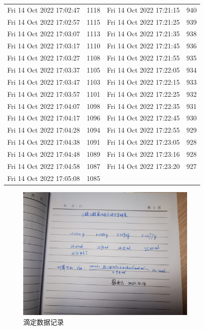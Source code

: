 \documentclass[12pt]{ctexart}
\numberwithin{equation}{section}
\begin{document}
\begin{longtable}{cc|cc}
Fri 14 Oct 2022 17:02:47 & 1118 & Fri 14 Oct 2022 17:21:15 & 940 \\
Fri 14 Oct 2022 17:02:57 & 1115 & Fri 14 Oct 2022 17:21:25 & 939 \\
Fri 14 Oct 2022 17:03:07 & 1113 & Fri 14 Oct 2022 17:21:35 & 938 \\
Fri 14 Oct 2022 17:03:17 & 1110 & Fri 14 Oct 2022 17:21:45 & 936 \\
Fri 14 Oct 2022 17:03:27 & 1108 & Fri 14 Oct 2022 17:21:55 & 935 \\
Fri 14 Oct 2022 17:03:37 & 1105 & Fri 14 Oct 2022 17:22:05 & 934 \\
Fri 14 Oct 2022 17:03:47 & 1103 & Fri 14 Oct 2022 17:22:15 & 933 \\
Fri 14 Oct 2022 17:03:57 & 1101 & Fri 14 Oct 2022 17:22:25 & 932 \\
Fri 14 Oct 2022 17:04:07 & 1098 & Fri 14 Oct 2022 17:22:35 & 931 \\
Fri 14 Oct 2022 17:04:17 & 1096 & Fri 14 Oct 2022 17:22:45 & 930 \\
Fri 14 Oct 2022 17:04:28 & 1094 & Fri 14 Oct 2022 17:22:55 & 929 \\
Fri 14 Oct 2022 17:04:38 & 1091 & Fri 14 Oct 2022 17:23:05 & 928 \\
Fri 14 Oct 2022 17:04:48 & 1089 & Fri 14 Oct 2022 17:23:16 & 928 \\
Fri 14 Oct 2022 17:04:58 & 1087 & Fri 14 Oct 2022 17:23:20 & 927 \\
Fri 14 Oct 2022 17:05:08 & 1085 \\
    \hline
\end{longtable}

\begin{figure}[ht]
    \centering
    \includegraphics[width=0.8\textwidth]{原始数据.jpg}
    \caption{滴定数据记录}
    \label{fig}
\end{figure}
\end{document}
